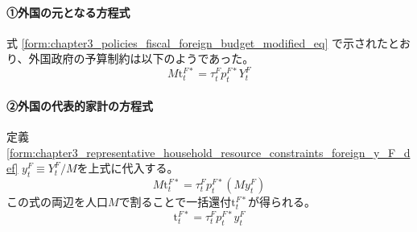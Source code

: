 \paragraph{①外国の元となる方程式}
\label{sec:chapter3_representative_household_fiscal_policy_foreign_original}
式
\eqref{form:chapter3_policies_fiscal_foreign_budget_modified_eq}
で示されたとおり、外国政府の予算制約は以下のようであった。
\begin{equation}
\label{form:chapter3_representative_household_fiscal_policy_foreign_original_budget_eq}
    M\mathrm{t}_t^{F*}=\tau_t^Fp_t^{F*}Y_t^F
\end{equation}

\paragraph{②外国の代表的家計の方程式}
\label{sec:chapter3_representative_household_fiscal_policy_foreign_representative}
定義
\eqref{form:chapter3_representative_household_resource_constraints_foreign_y_F_def}
\(y_t^F\equiv Y_t^F/M\)を上式に代入する。
\begin{equation}
\label{form:chapter3_representative_household_fiscal_policy_foreign_representative_budget_eq}
    M\mathrm{t}_t^{F*}=\tau_t^Fp_t^{F*}(My_t^F)
\end{equation}
この式の両辺を人口\(M\)で割ることで一括還付\(\mathrm{t}_t^{F*}\)が得られる。
\begin{equation}
\label{form:chapter3_representative_household_fiscal_policy_foreign_representative_budget2_eq}
    \mathrm{t}_t^{F*}=\tau_t^Fp_t^{F*}y_t^F
\end{equation}